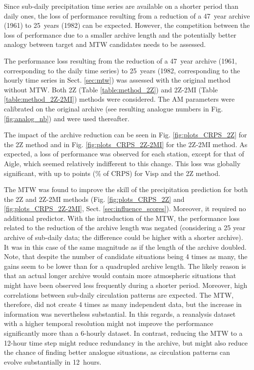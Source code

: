 \documentclass[hess, manuscript]{copernicus}
\begin{document}
	
	Since sub-daily precipitation time series are available on a shorter period than daily ones, the loss of performance resulting from a reduction of a 47~year archive (1961) to 25~years (1982) can be expected. However, the competition between the loss of performance due to a smaller archive length and the potentially better analogy between target and MTW candidates needs to be assessed.
	
	
	
	The performance loss resulting from the reduction of a 47~year archive (1961, corresponding to the daily time series) to 25~years (1982, corresponding to the hourly time series in Sect. \ref{sec:mtw}) was assessed with the original method without MTW. Both 2Z (Table \ref{table:method_2Z}) and 2Z-2MI (Table \ref{table:method_2Z-2MI}) methods were considered. The AM parameters were calibrated on the original archive (see resulting analogue numbers in Fig. \ref{fig:analog_nb}) and were used thereafter.
	
	The impact of the archive reduction can be seen in Fig. \ref{fig:plots_CRPS_2Z} for the 2Z method and in Fig. \ref{fig:plots_CRPS_2Z-2MI} for the 2Z-2MI method. As expected, a loss of performance was observed for each station, except for that of Aigle, which seemed relatively indifferent to this change. This loss was globally significant, with up to  points (\% of CRPS) for Visp and the 2Z method. 
	
	
	
	
	The MTW was found to improve the skill of the precipitation prediction for both the 2Z and 2Z-2MI methods (Fig. \ref{fig:plots_CRPS_2Z} and \ref{fig:plots_CRPS_2Z-2MI}, Sect. \ref{sec:influence_scores}). Moreover, it required no additional predictor. With the introduction of the MTW, the performance loss related to the reduction of the archive length was negated (considering a 25 year archive of sub-daily data; the difference could be higher with a shorter archive). It was in this case of the same magnitude as if the length of the archive doubled. Note, that despite the number of candidate situations being 4 times as many, the gains seem to be lower than for a quadrupled archive length. The likely reason is that an actual longer archive would contain more atmospheric situations that might have been observed less frequently during a shorter period. Moreover, high correlations between sub-daily circulation patterns are expected. The MTW, therefore, did not create 4 times as many independent data, but the increase in information was nevertheless substantial. In this regards, a reanalysis dataset with a higher temporal resolution might not improve the performance significantly more than a 6-hourly dataset. In contrast, reducing the MTW to a 12-hour time step might reduce redundancy in the archive, but might also reduce the chance of finding better analogue situations, as circulation patterns can evolve substantially in 12~hours.
	
\end{document}
